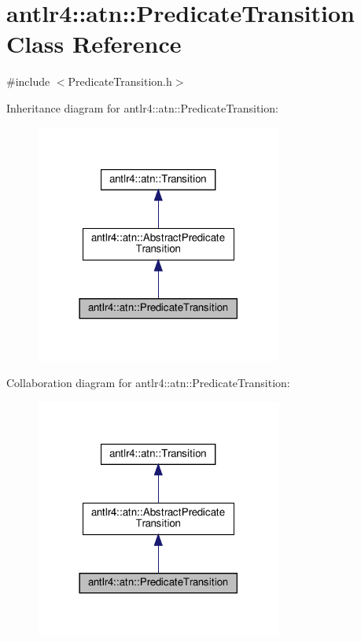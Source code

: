 \hypertarget{classantlr4_1_1atn_1_1PredicateTransition}{}\section{antlr4\+:\+:atn\+:\+:Predicate\+Transition Class Reference}
\label{classantlr4_1_1atn_1_1PredicateTransition}


{\ttfamily \#include $<$Predicate\+Transition.\+h$>$}



Inheritance diagram for antlr4\+:\+:atn\+:\+:Predicate\+Transition\+:
\nopagebreak
\begin{figure}[H]
\begin{center}
\leavevmode
\includegraphics[width=230pt]{classantlr4_1_1atn_1_1PredicateTransition__inherit__graph}
\end{center}
\end{figure}


Collaboration diagram for antlr4\+:\+:atn\+:\+:Predicate\+Transition\+:
\nopagebreak
\begin{figure}[H]
\begin{center}
\leavevmode
\includegraphics[width=230pt]{classantlr4_1_1atn_1_1PredicateTransition__coll__graph}
\end{center}
\end{figure}
